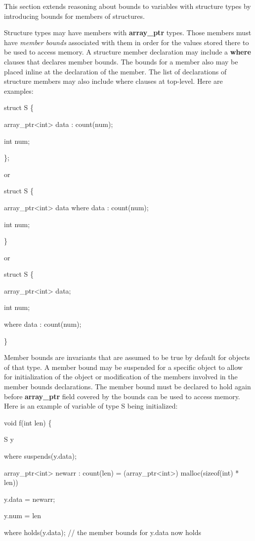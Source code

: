 \documentclass[]{article}
\begin{document}
This section extends reasoning about bounds to variables with structure
types by introducing bounds for members of structures.

Structure types may have members with \textbf{array\_ptr} types. Those
members must have \emph{member bounds} associated with them in order for
the values stored there to be used to access memory. A structure member
declaration may include a \textbf{where} clauses that declares member
bounds. The bounds for a member also may be placed inline at the
declaration of the member. The list of declarations of structure members
may also include where clauses at top-level. Here are examples:

struct S \{

array\_ptr\textless{}int\textgreater{} data : count(num);

int num;

\};

or

struct S \{

array\_ptr\textless{}int\textgreater{} data where data : count(num);

int num;

\}

or

struct S \{

array\_ptr\textless{}int\textgreater{} data;

int num;

where data : count(num);

\}

Member bounds are invariants that are assumed to be true by default for
objects of that type. A member bound may be suspended for a specific
object to allow for initialization of the object or modification of the
members involved in the member bounds declarations. The member bound
must be declared to hold again before \textbf{array\_ptr} field covered
by the bounds can be used to access memory. Here is an example of
variable of type S being initialized:

void f(int len) \{

S y

where suspends(y.data);

array\_ptr\textless{}int\textgreater{} newarr : count(len) =
(array\_ptr\textless{}int\textgreater{}) malloc(sizeof(int) * len))

y.data = newarr;

y.num = len

where holds(y.data); // the member bounds for y.data now holds
\end{document}

